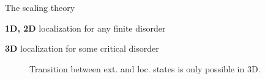 \documentclass[1pt]{beamer}
\begin{document}
\begin{frame}{The scaling theory}
\begin{minipage}[c]{0.36\textwidth}
\begin{alertblock}{\centering\textbf{1D, 2D}}
\centering localization for any finite disorder
\end{alertblock}\vspace{0.65cm}
\begin{alertblock}{\centering\textbf{3D}}
\centering localization for some critical disorder
\end{alertblock}\vspace{0.35cm}
\end{minipage}\hfill
\begin{minipage}[c]{0.6\textwidth}
\begin{figure}
\caption{Transition between ext. and loc. states is only possible in 3D.}
\end{figure}
\end{minipage}
\end{frame}
\end{document}
